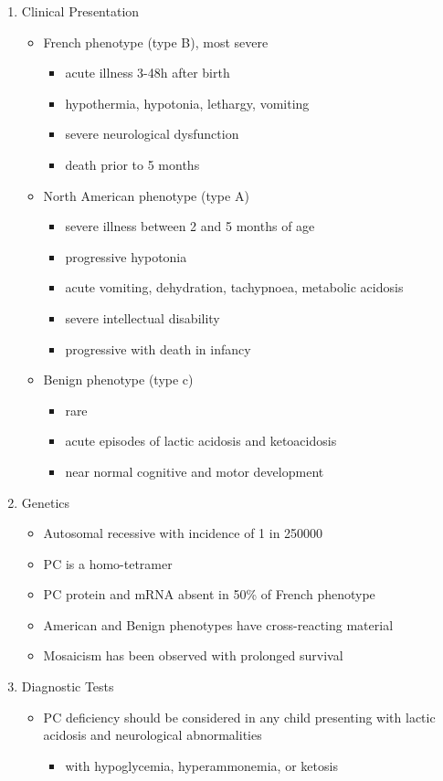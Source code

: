 \documentclass{scrartcl}
\begin{document}
\begin{enumerate}
\item Clinical Presentation
\label{sec:org896f606}
\begin{itemize}
\item French phenotype (type B), most severe
\begin{itemize}
\item acute illness 3-48h after birth
\item hypothermia, hypotonia, lethargy, vomiting
\item severe neurological dysfunction
\item death prior to 5 months
\end{itemize}
\item North American phenotype (type A)
\begin{itemize}
\item severe illness between 2 and 5 months of age
\item progressive hypotonia
\item acute vomiting, dehydration, tachypnoea, metabolic acidosis
\item severe intellectual disability
\item progressive with death in infancy
\end{itemize}
\item Benign phenotype (type c)
\begin{itemize}
\item rare
\item acute episodes of lactic acidosis and ketoacidosis
\item near normal cognitive and motor development
\end{itemize}
\end{itemize}
\item Genetics
\label{sec:org86359bf}
\begin{itemize}
\item Autosomal recessive with incidence of 1 in 250000
\item PC is a homo-tetramer
\item PC protein and mRNA absent in 50\% of French phenotype
\item American and Benign phenotypes have cross-reacting material
\item Mosaicism has been observed with prolonged survival
\end{itemize}

\item Diagnostic Tests
\label{sec:org64254d3}
\begin{itemize}
\item PC deficiency should be considered in any child presenting with
lactic acidosis and neurological abnormalities
\begin{itemize}
\item with hypoglycemia, hyperammonemia, or ketosis
\end{itemize}


\end{itemize}
\end{enumerate}
\end{document}
